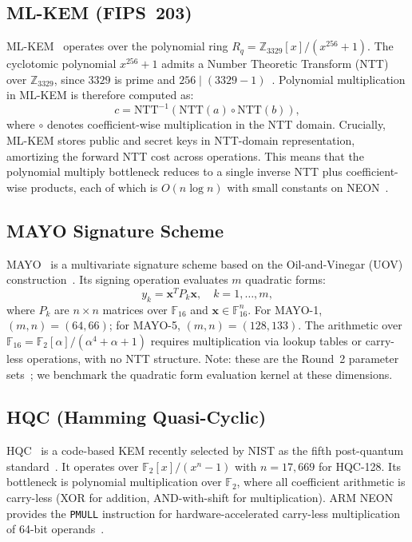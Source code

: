 \documentclass[utf8]{FrontiersinHarvard}
\begin{document}
\subsection{ML-KEM (FIPS~203)}

ML-KEM~\cite{fips203} operates over the polynomial ring $R_q = \mathbb{Z}_{3329}[x]/(x^{256}+1)$. The cyclotomic polynomial $x^{256}+1$ admits a Number Theoretic Transform (NTT) over $\mathbb{Z}_{3329}$, since $3329$ is prime and $256 \mid (3329-1)$~\cite{longa2016speeding}. Polynomial multiplication in ML-KEM is therefore computed as:
\[
  c = \text{NTT}^{-1}(\text{NTT}(a) \circ \text{NTT}(b)),
\]
where $\circ$ denotes coefficient-wise multiplication in the NTT domain. Crucially, ML-KEM stores public and secret keys in NTT-domain representation, amortizing the forward NTT cost across operations. This means that the polynomial multiply bottleneck reduces to a single inverse NTT plus coefficient-wise products, each of which is $O(n \log n)$ with small constants on NEON~\cite{becker2022neon}.

\subsection{MAYO Signature Scheme}

MAYO~\cite{mayo2025spec,beullens2022mayo} is a multivariate signature scheme based on the Oil-and-Vinegar (UOV) construction~\cite{kipnis1999uov}. Its signing operation evaluates $m$ quadratic forms:
\[
  y_k = \mathbf{x}^T P_k \mathbf{x}, \quad k = 1, \ldots, m,
\]
where $P_k$ are $n \times n$ matrices over $\mathbb{F}_{16}$ and $\mathbf{x} \in \mathbb{F}_{16}^n$. For MAYO-1, $(m, n) = (64, 66)$; for MAYO-5, $(m, n) = (128, 133)$. The arithmetic over $\mathbb{F}_{16} = \mathbb{F}_2[\alpha]/(\alpha^4 + \alpha + 1)$ requires multiplication via lookup tables or carry-less operations, with no NTT structure. Note: these are the Round~2 parameter sets~\cite{mayo2025spec}; we benchmark the quadratic form evaluation kernel at these dimensions.

\subsection{HQC (Hamming Quasi-Cyclic)}

HQC~\cite{hqc2025spec} is a code-based KEM recently selected by NIST as the fifth post-quantum standard~\cite{nist2025hqc}. It operates over $\mathbb{F}_2[x]/(x^n - 1)$ with $n = 17{,}669$ for HQC-128. Its bottleneck is polynomial multiplication over $\mathbb{F}_2$, where all coefficient arithmetic is carry-less (XOR for addition, AND-with-shift for multiplication). ARM NEON provides the \texttt{PMULL} instruction for hardware-accelerated carry-less multiplication of 64-bit operands~\cite{arm2021neon}.
\end{document}
